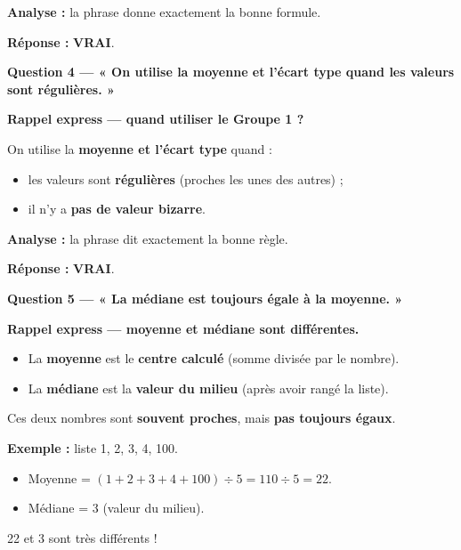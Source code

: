 \documentclass[12pt,a4paper]{article}
\begin{document}
\vspace{0.3cm}
\textbf{Analyse :} la phrase donne exactement la bonne formule.

\vspace{0.3cm}
\textbf{Réponse :} \textbf{VRAI}.

\vspace{0.5cm}

\begin{correctionbox}
\textbf{Question 4 — « On utilise la moyenne et l'écart type quand les valeurs sont régulières. »}
\end{correctionbox}

\begin{rappelcible}
\textbf{Rappel express — quand utiliser le Groupe 1 ?}

\vspace{0.2cm}
On utilise la \textbf{moyenne et l'écart type} quand :
\begin{itemize}[leftmargin=*]
  \item les valeurs sont \textbf{régulières} (proches les unes des autres) ;
  \item il n'y a \textbf{pas de valeur bizarre}.
\end{itemize}
\end{rappelcible}

\vspace{0.3cm}
\textbf{Analyse :} la phrase dit exactement la bonne règle.

\vspace{0.3cm}
\textbf{Réponse :} \textbf{VRAI}.

\vspace{0.5cm}

\begin{correctionbox}
\textbf{Question 5 — « La médiane est toujours égale à la moyenne. »}
\end{correctionbox}

\begin{rappelcible}
\textbf{Rappel express — moyenne et médiane sont différentes.}

\vspace{0.2cm}
\begin{itemize}[leftmargin=*]
  \item La \textbf{moyenne} est le \textbf{centre calculé} (somme divisée par le nombre).
  \item La \textbf{médiane} est la \textbf{valeur du milieu} (après avoir rangé la liste).
\end{itemize}

\vspace{0.2cm}
Ces deux nombres sont \textbf{souvent proches}, mais \textbf{pas toujours égaux}.

\vspace{0.2cm}
\textbf{Exemple :} liste 1, 2, 3, 4, 100.
\begin{itemize}
  \item Moyenne = $(1+2+3+4+100) \div 5 = 110 \div 5 = 22$.
  \item Médiane = 3 (valeur du milieu).
\end{itemize}
22 et 3 sont très différents !
\end{rappelcible}
\end{document}
